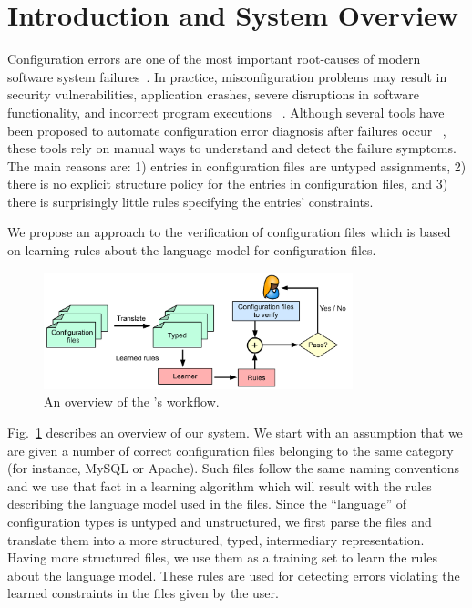 \section{Introduction and System Overview}
\label{sec:Intro}

Configuration errors are one of the most important root-causes of 
modern software system failures~\cite{xu15systems,yin11anempirical}. 
In practice, misconfiguration problems may result in 
security vulnerabilities,
application crashes, severe disruptions in software functionality,
and incorrect program executions%
~\cite{xu15systems,zhang14encore,yuan11context}.
Although several tools have been proposed to automate configuration
error diagnosis after failures occur%
~\cite{wang04automatic,attariyan10automating,%
su07autobash,whitaker04configuration}, 
these tools rely on manual ways to understand and detect the failure 
symptoms. The main reasons are:
1) entries in configuration files are untyped assignments, 
2) there is no explicit structure policy for the entries in 
configuration files, and 3) there is surprisingly little rules 
specifying the entries' constraints.

We propose an approach to the verification of  
configuration files which is based on learning rules about the language 
model for configuration files. 

\begin{figure}[t] \centering
\includegraphics[width=0.8\textwidth]{figs/overview}
\caption{An overview of the \app's workflow.}
\label{fig-overview}
\end{figure}

Fig.~\ref{fig-overview} describes an overview of our system. We start with
an assumption that we are given a number of correct configuration files belonging to the same category (for instance, MySQL or Apache). Such files
follow the same naming conventions and we use that fact in a learning 
algorithm which will result with the rules describing the language model used in the files. Since the ``language'' of configuration types is untyped and unstructured, we first parse the files and translate them 
into a more structured, typed, intermediary representation. Having more structured files, we use them as a training set to learn the rules about the 
language model. These rules are used for detecting errors violating the learned constraints in the files given by the user.

